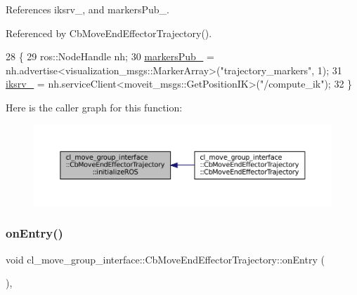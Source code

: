 References iksrv\+\_\+, and markers\+Pub\+\_\+.



Referenced by Cb\+Move\+End\+Effector\+Trajectory().


\begin{DoxyCode}
28     \{
29         ros::NodeHandle nh;
30         \hyperlink{classcl__move__group__interface_1_1CbMoveEndEffectorTrajectory_aabc2216b2d8625fecd83c5ec69928e63}{markersPub\_} = nh.advertise<visualization\_msgs::MarkerArray>(\textcolor{stringliteral}{"trajectory\_markers"}, 1);
31         \hyperlink{classcl__move__group__interface_1_1CbMoveEndEffectorTrajectory_a8a2e2225a5b53325241e45e4e28fa3a7}{iksrv\_} = nh.serviceClient<moveit\_msgs::GetPositionIK>(\textcolor{stringliteral}{"/compute\_ik"});
32     \}
\end{DoxyCode}
Here is the caller graph for this function\+:
\nopagebreak
\begin{figure}[H]
\begin{center}
\leavevmode
\includegraphics[width=350pt]{classcl__move__group__interface_1_1CbMoveEndEffectorTrajectory_afcee8f3853a5cef8806137a304c8a14b_icgraph}
\end{center}
\end{figure}
\mbox{\label{classcl__move__group__interface_1_1CbMoveEndEffectorTrajectory_aaedd074fd178c6390a4a3f1ccff23ad3}} 
\subsubsection{\texorpdfstring{on\+Entry()}{onEntry()}}
{\footnotesize\ttfamily void cl\+\_\+move\+\_\+group\+\_\+interface\+::\+Cb\+Move\+End\+Effector\+Trajectory\+::on\+Entry (\begin{DoxyParamCaption}{ }\end{DoxyParamCaption})\hspace{0.3cm}{\ttfamily [override]}, {\ttfamily [virtual]}}



